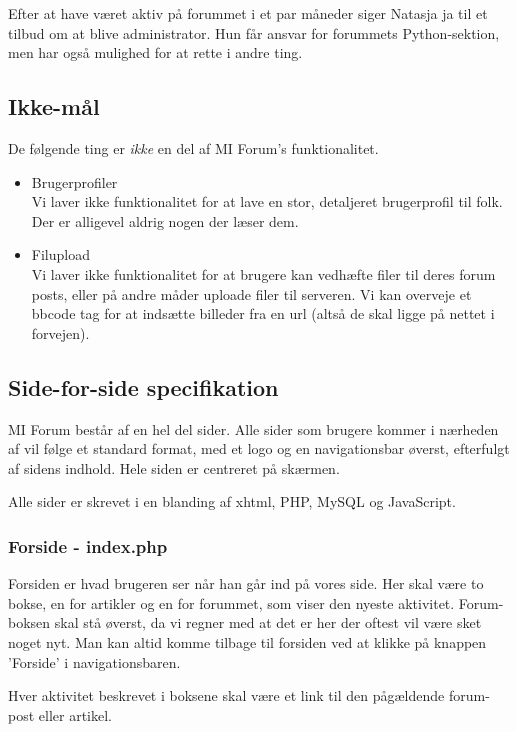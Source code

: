 \documentclass{article}
\begin{document}
Efter at have været aktiv på forummet i et par måneder siger Natasja ja til et tilbud om at blive administrator. Hun får ansvar for forummets Python-sektion, men har også mulighed for at rette i andre ting.

\subsection{Ikke-mål}

De følgende ting er \emph{ikke} en del af MI Forum's funktionalitet.

\begin{itemize}
	\item Brugerprofiler \\
	Vi laver ikke funktionalitet for at lave en stor, detaljeret brugerprofil til folk. Der er alligevel aldrig nogen der læser dem.
	\item Filupload \\
	Vi laver ikke funktionalitet for at brugere kan vedhæfte filer til deres forum posts, eller på andre måder uploade filer til serveren. Vi kan overveje et bbcode tag for at indsætte billeder fra en url (altså de skal ligge på nettet i forvejen).
\end{itemize}

\subsection{Side-for-side specifikation}

MI Forum består af en hel del sider. Alle sider som brugere kommer i nærheden af vil følge et standard format, med et logo og en navigationsbar øverst, efterfulgt af sidens indhold. Hele siden er centreret på skærmen.

Alle sider er skrevet i en blanding af xhtml, PHP, MySQL og JavaScript.

\subsubsection[Forside]{Forside - index.php}

Forsiden er hvad brugeren ser når han går ind på vores side. Her skal være to bokse, en for artikler og en for forummet, som viser den nyeste aktivitet. Forum-boksen skal stå øverst, da vi regner med at det er her der oftest vil være sket noget nyt. Man kan altid komme tilbage til forsiden ved at klikke på knappen 'Forside' i navigationsbaren.

Hver aktivitet beskrevet i boksene skal være et link til den pågældende forum-post eller artikel.
\end{document}
